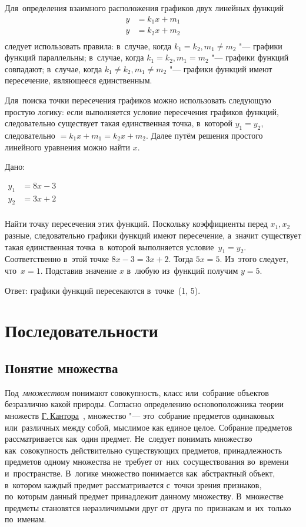 \documentclass[]{scrartcl}
\begin{document}
Для~определения взаимного расположения графиков двух линейных функций
\begin{equation*}\label{eq:linear-func-3}
\begin{aligned}
y&=k_{1}x+m_1\\
y&=k_{2}x+m_2\\
\end{aligned}
\end{equation*}
следует использовать правила: в~случае, когда $k_1=k_2, m_1 \neq m_2$ "--- графики функций параллельны; в~случае, когда $k_1=k_2, m_1=m_2$ "--- графики функций совпадают; в~случае, когда $k_1 \neq k_2, m_1 \neq m_2$ "--- графики функций имеют пересечение, являющееся единственным. 

Для~поиска точки пересечения графиков можно использовать следующую простую логику: если выполняется условие пересечения графиков функций, следовательно существует такая единственная точка, в~которой $y_1=y_2$, следовательно $=k_{1}x+m_1 = k_{2}x+m_2$. Далее путём решения простого линейного уравнения можно найти $x$.

\begin{Thexmpl}\label{ex:two-linear-1}
	Дано:
	
	$\begin{aligned}
	y_{1}&=8x - 3\\
	y_{2}&=3x + 2\\
	\end{aligned}$
	
	Найти точку пересечения этих функций. Поскольку коэффициенты перед $x_1, x_2$ разные, следовательно графики функций имеют пересечение, а~значит существует такая единственная точка~в~которой выполняется условие~$y_1=y_2$. Соответственно в~этой точке $8x - 3 = 3x + 2$. Тогда $5x=5$. Из~этого следует, что~$x=1$. Подставив значение $x$ в~любую из~функций получим $y=5$.
	
	Ответ: графики функций пересекаются в~точке~(1, 5).
\end{Thexmpl}

\section{Последовательности}
\subsection{Понятие множества}\label{multiple:definition}
Под~\emph{множеством} понимают совокупность, класс или~собрание объектов безразлично какой природы. Согласно определению основоположника теории множеств \href{https://ru.wikipedia.org/wiki/Кантор,_Георг}{Г.\,Кантора}~\cite{Wiki:Kantor}, множество "--- это~собрание предметов одинаковых или~различных между собой, мыслимое как единое целое. Собрание предметов рассматривается как~один предмет. Не~следует понимать множество как~совокупность действительно существующих предметов, принадлежность предметов одному множества не~требует от~них~сосуществования во~времени и~пространстве. В~логике множество понимается как~абстрактный объект, в~котором каждый предмет рассматривается с~точки зрения признаков, по~которым данный предмет принадлежит данному множеству. В~множестве предметы становятся неразличимыми друг от~друга по~признакам и~их~только по~именам.
\end{document}
